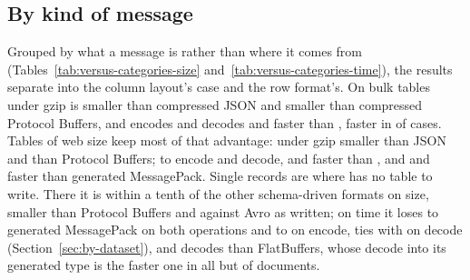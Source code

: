 \FloatBarrier
\subsection{By kind of message}
\label{sec:by-kind}

\begin{table}[t]
\centering\footnotesize
\setlength{\tabcolsep}{4pt}
\caption{Size by kind of message (Section~\ref{sec:kinds}): bulk tables
( cases), tables of web size
() and single records
(, of which \colbin{} carries
). As in
Table~\ref{tab:versus-datasets-size}.}
\label{tab:versus-categories-size}
\end{table}

\begin{table}[t]
\centering\footnotesize
\setlength{\tabcolsep}{4pt}
\caption{Time by kind of message. As in Table~\ref{tab:versus-datasets-time}.}
\label{tab:versus-categories-time}
\end{table}

Grouped by what a message is rather than where it comes from
(Tables~\ref{tab:versus-categories-size}
and~\ref{tab:versus-categories-time}), the results separate into the
column layout's case and the row format's. On bulk tables \colbin{} under
gzip is  smaller than compressed JSON and
 smaller than compressed Protocol
Buffers, and encodes and decodes  and
 faster than ,
faster in  of
 cases. Tables of web
size keep most of that advantage: under gzip
 smaller than JSON and
 than Protocol Buffers; to encode
and decode,  and
 faster than
, and  and
 faster than generated
MessagePack. Single records are where \colbin{} has no table to write.
There it is within a tenth of the other schema-driven formats on size,
 smaller than Protocol Buffers
and  against Avro as written; on time
it loses to generated MessagePack on both operations and to 
on encode, ties with  on decode
(Section~\ref{sec:by-dataset}), and decodes
{\let\textbf\relax{}}
than FlatBuffers, whose decode into its generated type is the faster one
in all but 
of 
documents.

